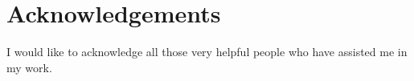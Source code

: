 \chapter*{Acknowledgements}

I would like to acknowledge all those very helpful people who have
assisted me in my work.

